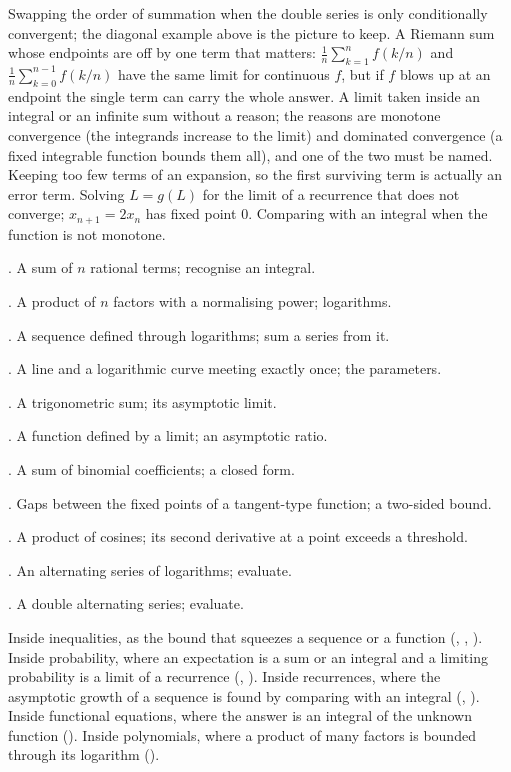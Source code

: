 \begin{trap}
Swapping the order of summation when the double series is only conditionally convergent; the diagonal example above is the picture to keep. A Riemann sum whose endpoints are off by one term that matters: $\frac1n\sum_{k=1}^n f(k/n)$ and $\frac1n\sum_{k=0}^{n-1}f(k/n)$ have the same limit for continuous $f$, but if $f$ blows up at an endpoint the single term can carry the whole answer. A limit taken inside an integral or an infinite sum without a reason; the reasons are monotone convergence (the integrands increase to the limit) and dominated convergence (a fixed integrable function bounds them all), and one of the two must be named. Keeping too few terms of an expansion, so the first surviving term is actually an error term. Solving $L=g(L)$ for the limit of a recurrence that does not converge; $x_{n+1}=2x_n$ has fixed point $0$. Comparing with an integral when the function is not monotone.
\end{trap}

\begin{ladder}
\item {}. A sum of $n$ rational terms; recognise an integral.
\item {}. A product of $n$ factors with a normalising power; logarithms.
\item {}. A sequence defined through logarithms; sum a series from it.
\item {}. A line and a logarithmic curve meeting exactly once; the parameters.
\item {}. A trigonometric sum; its asymptotic limit.
\item {}. A function defined by a limit; an asymptotic ratio.
\item {}. A sum of binomial coefficients; a closed form.
\item {}. Gaps between the fixed points of a tangent-type function; a two-sided bound.
\item {}. A product of cosines; its second derivative at a point exceeds a threshold.
\item {}. An alternating series of logarithms; evaluate.
\item {}. A double alternating series; evaluate.
\end{ladder}

\begin{hides}
Inside inequalities, as the bound that squeezes a sequence or a function (, , ). Inside probability, where an expectation is a sum or an integral and a limiting probability is a limit of a recurrence (, ). Inside recurrences, where the asymptotic growth of a sequence is found by comparing with an integral (, ). Inside functional equations, where the answer is an integral of the unknown function (). Inside polynomials, where a product of many factors is bounded through its logarithm ().
\end{hides}
